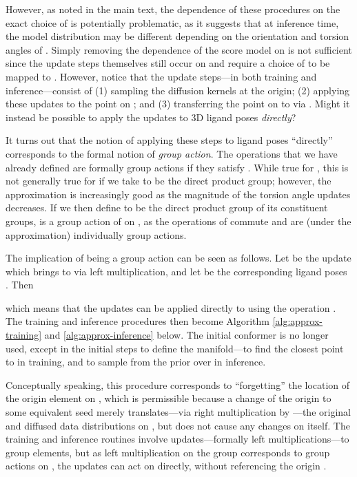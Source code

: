 \documentclass{article} \usepackage{iclr2023_conference,times}
\begin{document}
However, as noted in the main text, the dependence of these procedures on the exact choice of  is potentially problematic, as it suggests that at inference time, the model distribution may be different depending on the orientation and torsion angles of . Simply removing the dependence of the score model on  is not sufficient since the update steps themselves still occur on  and require a choice of  to be mapped to . However, notice that the update steps---in both training and inference---consist of (1) sampling the diffusion kernels at the origin; (2) applying these updates to the point on ; and (3) transferring the point on  to  via . Might it instead be possible to apply the updates to 3D ligand poses  \emph{directly}?

It turns out that the notion of applying these steps to ligand poses ``directly'' corresponds to the formal notion of \emph{group action}. The operations  that we have already defined are formally group actions if they satisfy . While true for , this is not generally true for  if we take  to be the direct product group; however, the approximation is increasingly good as the magnitude of the torsion angle updates decreases. If we then define  to be the direct product group of its constituent groups,  is a group action of  on , as the operations of  commute and are (under the approximation) individually group actions.

The implication of  being a group action can be seen as follows. Let  be the update which brings  to  via left multiplication, and let  be the corresponding ligand poses . Then

which means that the updates  can be applied directly to  using the operation . The training and inference procedures then become Algorithm \ref{alg:approx-training} and \ref{alg:approx-inference} below. The initial conformer  is no longer used, except in the initial steps to define the manifold---to find the closest point to  in training, and to sample  from the prior over  in inference.

Conceptually speaking, this procedure corresponds to ``forgetting'' the location of the origin element on , which is permissible because a change of the origin to some equivalent seed  merely translates---via right multiplication by ---the original and diffused data distributions on , but does not cause any changes on  itself. The training and inference routines involve updates---formally left multiplications---to group elements, but as left multiplication on the group corresponds to group actions on , the updates can act on  directly, without referencing the origin .
\end{document}
